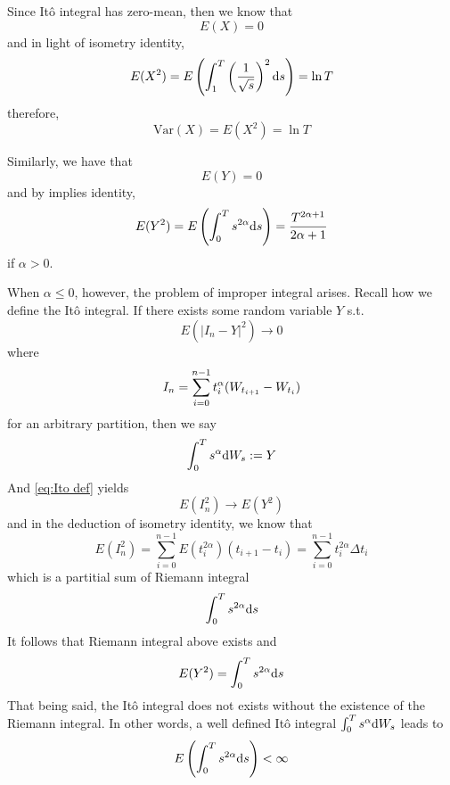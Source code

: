 \documentclass{homework}
\newcommand{\var}{\mathrm{Var}}
\begin{document}
    \problem
    \begin{subproblem}[(\arabic*).]
        \item
        Since It\^o integral has zero-mean, then
        we know that
        \[E(X)=0\]
        and in light of isometry identity,
        \[E(X^2)=E\left(\int_1^T\left(\frac{1}{\sqrt s}\right)^2
        \mathrm d s\right)=\ln T\]
        therefore,
        \[\var(X)=E(X^2)=\ln T\]

        \item
        Similarly, we have that
        \[E(Y)=0\]
        and by implies identity,
        \[E(Y^2)=E\left(\int_0^Ts^{2\alpha}\mathrm d s\right)
        =\frac{T^{2\alpha+1}}{2\alpha+1}\]
        if $\alpha>0$.

        When $\alpha\leq 0$, however,
        the problem of improper integral arises.
        Recall how we define the It\^o integral.
        If there exists some random variable $Y$ s.t.
        \begin{equation}
            \label{eq:Ito def}
            E(|I_n-Y|^2)\to 0
        \end{equation}
        where
        \[I_n=\sum_{i=0}^{n-1}t_i^\alpha(W_{t_{i+1}}-W_{t_i})\]
        for an arbitrary partition,
        then we say
        \[\int_0^Ts^\alpha\mathrm d W_s:=Y\]
        And \cref{eq:Ito def} yields
        \[E(I_n^2)\to E(Y^2)\]
        and in the deduction of isometry identity, we know that
        \[E(I_n^2)=\sum_{i=0}^{n-1}E(t_i^{2\alpha})(t_{i+1}-t_i)
        =\sum_{i=0}^{n-1}t_i^{2\alpha}\Delta t_i\]
        which is a partitial sum of Riemann integral
        \begin{equation}
            \label{eq:Riemann int}
            \int_0^Ts^{2\alpha}\mathrm d s
        \end{equation}
        It follows that Riemann integral above exists
        and
        \[E(Y^2)=\int_0^Ts^{2\alpha}\mathrm d s\]
        That being said, the It\^o integral does not exists
        without the existence of the Riemann integral.
        In other words, a well defined It\^o integral
        $\int_0^Ts^\alpha\mathrm d W_s$
        leads to
        \[E\left(\int_0^Ts^{2\alpha}\mathrm d s\right)<\infty\]


\end{subproblem}
\end{document}
